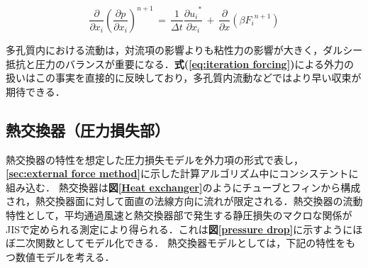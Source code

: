 \begin{equation}
\frac{\partial}{\partial x_i} {\left( \frac{\partial p}{\partial x_i} \right)}^{n+1}
\,=\,
\frac{1}{\Delta t} \frac{ {\partial u_i}^*}{\partial x_i}
\,+\,
\frac{\partial}{\partial x} \left( \beta {F_i}^{n+1} \right)
\label{eq:iteration forcing}
\end{equation}

\vspace{3mm}


多孔質内における流動は，対流項の影響よりも粘性力の影響が大きく，ダルシー抵抗と圧力のバランスが重要になる．\textbf{式(\ref{eq:iteration forcing})}による外力の扱いはこの事実を直接的に反映しており，多孔質内流動などではより早い収束が期待できる．


%
\subsection{熱交換器（圧力損失部）}
熱交換器の特性を想定した圧力損失モデルを外力項の形式で表し，\textbf{\ref{sec:external force method}}に示した計算アルゴリズム中にコンシステントに組み込む．
熱交換器は\textbf{図\ref{Heat exchanger}}のようにチューブとフィンから構成され，熱交換器面に対して面直の法線方向に流れが限定される．熱交換器の流動特性として，平均通過風速と熱交換器部で発生する静圧損失のマクロな関係がJISで定められる測定により得られる．これは\textbf{図\ref{pressure drop}}に示すようにほぼ二次関数としてモデル化できる．
熱交換器モデルとしては，下記の特性をもつ数値モデルを考える．


